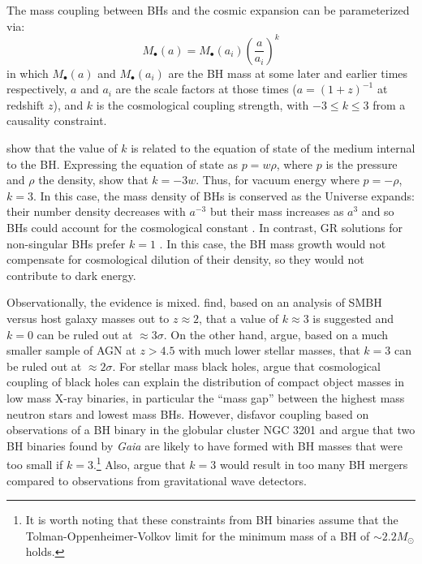 \documentclass[twocolumn]{aastex631}
\begin{document}
The mass coupling between BHs and the cosmic expansion can be parameterized via:
\begin{equation}\label{eqn:defk}
M_{\bullet}(a) = M_{\bullet}(a_i)\left(\frac{a}{a_{i}}\right)^k 
\end{equation}
\noindent \citep{cnf2020,2021ApJ...921L..22C} in which $M_{\bullet}(a)$ and $M_{\bullet}(a_i)$ are the BH mass at some later and earlier times respectively, $a$ and $a_{i}$ are the scale factors at those times ($a=(1+z)^{-1}$ at redshift $z$), and $k$ is the cosmological coupling strength, with $-3\leq k \leq 3$ from a causality constraint. 

\citet{cw19} show that the value of $k$ is related to the equation of state of the medium internal to the BH. Expressing the equation of state as $p=w\rho$, where $p$ is the pressure and $\rho$ the density, \citet{2021ApJ...921L..22C} show that $k=-3 w$. Thus, for vacuum energy where $p=-\rho$, $k=3$.
In this case, the mass density of BHs is conserved as the Universe expands: their number density decreases with $a^{-3}$ but their mass increases as $a^3$ and so BHs could account for the cosmological constant \citep{cw19,2023ApJ...944L..31F} \citep[see also ][for an alternative way BHs could be the origin of dark energy]{2009PhRvD..80d3513P}. In contrast, GR solutions for non-singular BHs prefer $k=1$ \citep{2023JCAP...11..007C}. In this case, the BH mass growth would not compensate for cosmological dilution of their density, so they would not contribute to dark energy. 

Observationally, the evidence is mixed. \citet{farrah23ellip, 2023ApJ...944L..31F} find, based on an analysis of SMBH versus host galaxy masses out to $z\approx 2$, that a value of $k\approx 3$ is suggested and $k=0$ can be ruled out at $\approx 3\sigma$. 
On the other hand, 
\citet{2023arXiv230503408L} argue, based on a much smaller sample of AGN at $z>4.5$ with much lower stellar masses, that $k=3$ can be ruled out at $\approx 2\sigma$. For stellar mass black holes, \citet{2023ApJ...956..128G} argue that cosmological coupling of black holes can explain the distribution of compact object masses in low mass X-ray binaries, in particular the ``mass gap'' between the highest mass neutron stars and lowest mass BHs. However,  \cite{2023ApJ...947L..12R} disfavor coupling based on observations of a BH binary in the globular cluster NGC 3201 and \citet{andrae23} argue that two BH binaries found by {\em Gaia} are likely to have formed with BH masses that were too small if $k=3$.\footnote{It is worth noting that these constraints from BH binaries assume that the Tolman-Oppenheimer-Volkov limit for the minimum mass of a BH of $\sim2.2M_{\odot}$ holds.} Also, \citet{2023OJAp....6E..25G} argue that $k=3$ would result in too many BH mergers compared to observations from gravitational wave detectors.
\end{document}
